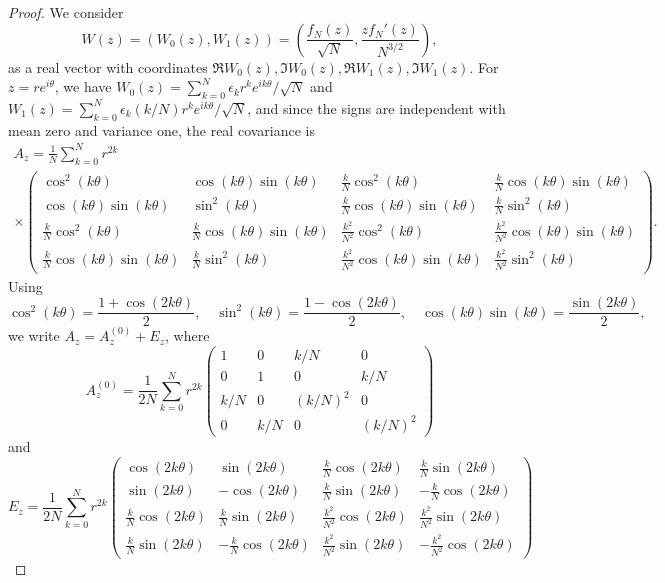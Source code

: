 \begin{proof}
We consider
\[
 W(z)=(W_0(z),W_1(z))=\left(\frac{f_N(z)}{\sqrt N},\frac{zf_N'(z)}{N^{3/2}}\right),
\]
as a real vector with coordinates $\Re W_0(z),\Im W_0(z),\Re W_1(z),\Im W_1(z)$.
For $z=re^{i\theta}$, we have
$W_0(z)=\sum_{k=0}^N\epsilon_kr^ke^{ik\theta}/\sqrt N$ and
$W_1(z)=\sum_{k=0}^N\epsilon_k(k/N)r^ke^{ik\theta}/\sqrt N$, and since the
signs are independent with mean zero and variance one, the real covariance
is
\begingroup
\setlength{\arraycolsep}{1.5pt}
\setlength{\multlinegap}{0pt}
\begin{multline*}
 A_z=\frac1N\sum_{k=0}^Nr^{2k}\\
 \times\begin{pmatrix}
 \cos^2(k\theta)&\cos(k\theta)\sin(k\theta)&
 \frac kN\cos^2(k\theta)&\frac kN\cos(k\theta)\sin(k\theta)\\
 \cos(k\theta)\sin(k\theta)&\sin^2(k\theta)&
 \frac kN\cos(k\theta)\sin(k\theta)&\frac kN\sin^2(k\theta)\\
 \frac kN\cos^2(k\theta)&\frac kN\cos(k\theta)\sin(k\theta)&
 \frac{k^2}{N^2}\cos^2(k\theta)&\frac{k^2}{N^2}\cos(k\theta)\sin(k\theta)\\
 \frac kN\cos(k\theta)\sin(k\theta)&\frac kN\sin^2(k\theta)&
 \frac{k^2}{N^2}\cos(k\theta)\sin(k\theta)&\frac{k^2}{N^2}\sin^2(k\theta)
 \end{pmatrix}.
\end{multline*}
\endgroup
Using
\[
 \cos^2(k\theta)=\frac{1+\cos(2k\theta)}2,\quad
 \sin^2(k\theta)=\frac{1-\cos(2k\theta)}2,\quad
 \cos(k\theta)\sin(k\theta)=\frac{\sin(2k\theta)}2,
\]
we write $A_z=A_z^{(0)}+E_z$, where
\[
 A_z^{(0)}=\frac1{2N}\sum_{k=0}^Nr^{2k}
 \begin{pmatrix}
 1&0&k/N&0\\0&1&0&k/N\\
 k/N&0&(k/N)^2&0\\0&k/N&0&(k/N)^2
 \end{pmatrix}
\]
and
\begingroup
\setlength{\arraycolsep}{1.5pt}
\[
 E_z=\frac1{2N}\sum_{k=0}^Nr^{2k}
 \begin{pmatrix}
 \cos(2k\theta)&\sin(2k\theta)&
 \frac kN\cos(2k\theta)&\frac kN\sin(2k\theta)\\
 \sin(2k\theta)&-\cos(2k\theta)&
 \frac kN\sin(2k\theta)&-\frac kN\cos(2k\theta)\\
 \frac kN\cos(2k\theta)&\frac kN\sin(2k\theta)&
 \frac{k^2}{N^2}\cos(2k\theta)&\frac{k^2}{N^2}\sin(2k\theta)\\
 \frac kN\sin(2k\theta)&-\frac kN\cos(2k\theta)&
 \frac{k^2}{N^2}\sin(2k\theta)&-\frac{k^2}{N^2}\cos(2k\theta)

\end{pmatrix}\]
\end{proof}
